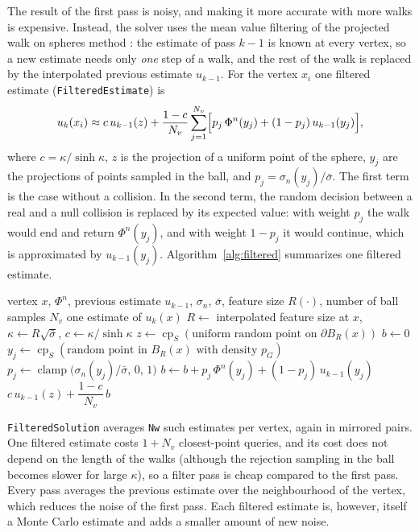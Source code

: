 \documentclass[
]{elteiktdk}[2024/04/26]
\begin{document}
	The result of the first pass is noisy, and making it more accurate with more walks is expensive. Instead, the solver uses the mean value filtering of the projected walk on spheres method \cite{Sugimoto:2024:PWoS}: the estimate of pass $k-1$ is known at every vertex, so a new estimate needs only \emph{one} step of a walk, and the rest of the walk is replaced by the interpolated previous estimate $u_{k-1}$. For the vertex $x_i$ one filtered estimate (\texttt{FilteredEstimate}) is
	\[
	u_k(x_i) \approx c \, u_{k-1}(z) + \frac{1 - c}{N_v} \sum_{j=1}^{N_v} \Bigl[ p_j \, \Phi^n(y_j) + (1 - p_j) \, u_{k-1}(y_j) \Bigr],
	\]
	where $c = \kappa / \sinh \kappa$, $z$ is the projection of a uniform point of the sphere, $y_j$ are the projections of points sampled in the ball, and $p_j = \sigma_n(y_j) / \bar{\sigma}$. The first term is the case without a collision. In the second term, the random decision between a real and a null collision is replaced by its expected value: with weight $p_j$ the walk would end and return $\Phi^n(y_j)$, and with weight $1 - p_j$ it would continue, which is approximated by $u_{k-1}(y_j)$.
	Algorithm~\ref{alg:filtered} summarizes one filtered estimate.
	
	\begin{algorithm}[ht]
		\small
		\caption[Filtered estimate]{One filtered estimate $\textsc{FilteredEstimate}(x)$ of $u_k(x)$.}
		\label{alg:filtered}
		\begin{algorithmic}[1]
			\Require vertex $x$, $\Phi^n$, previous estimate $u_{k-1}$, $\sigma_n$, $\bar\sigma$, feature size $R(\cdot)$, number of ball samples $N_v$
			\Ensure one estimate of $u_k(x)$
			\State $R \gets$ interpolated feature size at $x$, \quad $\kappa \gets R\sqrt{\bar\sigma}$, \quad $c \gets \kappa / \sinh\kappa$
			\State $z \gets \operatorname{cp}_S(\text{uniform random point on } \partial B_R(x))$
			\State $b \gets 0$
			\State $y_j \gets \operatorname{cp}_S(\text{random point in } B_R(x) \text{ with density } p_G)$
			\State $p_j \gets \operatorname{clamp}\bigl(\sigma_n(y_j) / \bar\sigma,\, 0,\, 1\bigr)$
			\State $b \gets b + p_j \, \Phi^n(y_j) + (1 - p_j) \, u_{k-1}(y_j)$
			\EndFor
			\State \Return $c \, u_{k-1}(z) + \dfrac{1 - c}{N_v}\, b$
		\end{algorithmic}
	\end{algorithm}
	\texttt{FilteredSolution} averages \texttt{Nw} such estimates per vertex, again in mirrored pairs. One filtered estimate costs $1 + N_v$ closest-point queries, and its cost does not depend on the length of the walks (although the rejection sampling in the ball becomes slower for large $\kappa$), so a filter pass is cheap compared to the first pass. Every pass averages the previous estimate over the neighbourhood of the vertex, which reduces the noise of the first pass. Each filtered estimate is, however, itself a Monte Carlo estimate and adds a smaller amount of new noise.
	
\end{document}
